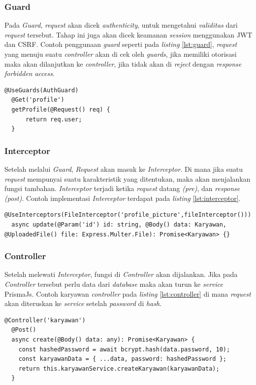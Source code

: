 \subsubsection{Guard}
Pada \textit{Guard}, \textit{request} akan dicek \textit{authenticity}, untuk mengetahui \textit{validitas} dari \textit{request} tersebut. Tahap ini juga akan dicek keamanan \textit{session} menggunakan JWT dan CSRF. Contoh penggunaan \textit{guard} seperti pada \textit{listing} \ref{lst:guard}, \textit{request} yang menuju suatu \textit{controller} akan di cek oleh \textit{guards}, jika memiliki otorisasi maka akan dilanjutkan ke \textit{controller}, jika tidak akan di \textit{reject} dengan \textit{response} \textit{forbidden} \textit{access}.
\begin{lstlisting}[caption={Penggunaan Guards pada Controller},label={lst:guard}]
  @UseGuards(AuthGuard)
  @Get('profile')
  getProfile(@Request() req) {
      return req.user;
  }
\end{lstlisting}


\subsubsection{Interceptor}
Setelah melalui \textit{Guard}, \textit{Request} akan masuk ke \textit{Interceptor}. Di mana jika suatu \textit{request} mempunyai suatu karakteristik yang ditentukan, maka akan menjalankan fungsi tambahan. \textit{Interceptor} terjadi ketika \textit{request} datang \textit{(pre)}, dan \textit{response} \textit{(post)}. Contoh implementasi \textit{Interceptor} terdapat pada \textit{listing} \ref{lst:interceptor}.
\begin{lstlisting}[caption={Interceptor},label={lst:interceptor}]
  @UseInterceptors(FileInterceptor('profile_picture',fileInterceptor()))
  async update(@Param('id') id: string, @Body() data: Karyawan, @UploadedFile() file: Express.Multer.File): Promise<Karyawan> {}
\end{lstlisting}

\subsubsection{Controller}
Setelah melewati \textit{Interceptor}, fungsi di \textit{Controller} akan dijalankan. Jika pada \textit{Controller} tersebut perlu data dari \textit{database} maka akan turun ke \textit{service} PrismaJs. Contoh karyawan \textit{controller} pada \textit{listing} \ref{lst:controller} di mana \textit{request} akan diteruskan ke \textit{service} setelah \textit{password} di \textit{hash}.
\begin{lstlisting}[caption={Controller},label={lst:controller}]
  @Controller('karyawan')
  @Post()
  async create(@Body() data: any): Promise<Karyawan> {
    const hashedPassword = await bcrypt.hash(data.password, 10);
    const karyawanData = { ...data, password: hashedPassword };
    return this.karyawanService.createKaryawan(karyawanData);
  }
\end{lstlisting}

